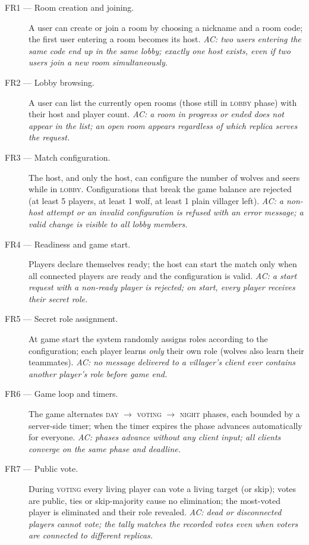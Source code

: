 \documentclass{scrartcl}
\begin{document}
\begin{description}
  \item[FR1 --- Room creation and joining.] A user can create or join a room
  by choosing a nickname and a room code; the first user entering a room
  becomes its host. \emph{AC: two users entering the same code end up in the
  same lobby; exactly one host exists, even if two users join a new room
  simultaneously.}

  \item[FR2 --- Lobby browsing.] A user can list the currently open rooms
  (those still in \textsc{lobby} phase) with their host and player count.
  \emph{AC: a room in progress or ended does not appear in the list; an open
  room appears regardless of which replica serves the request.}

  \item[FR3 --- Match configuration.] The host, and only the host, can
  configure the number of wolves and seers while in \textsc{lobby}.
  Configurations that break the game balance are rejected (at least 5
  players, at least 1 wolf, at least 1 plain villager left).
  \emph{AC: a non-host attempt or an invalid configuration is refused with
  an error message; a valid change is visible to all lobby members.}

  \item[FR4 --- Readiness and game start.] Players declare themselves ready;
  the host can start the match only when all connected players are ready
  and the configuration is valid. \emph{AC: a start request with a
  non-ready player is rejected; on start, every player receives their
  secret role.}

  \item[FR5 --- Secret role assignment.] At game start the system randomly
  assigns roles according to the configuration; each player learns
  \emph{only} their own role (wolves also learn their teammates).
  \emph{AC: no message delivered to a villager's client ever contains
  another player's role before game end.}

  \item[FR6 --- Game loop and timers.] The game alternates
  \textsc{day} $\to$ \textsc{voting} $\to$ \textsc{night} phases, each
  bounded by a server-side timer; when the timer expires the phase advances
  automatically for everyone. \emph{AC: phases advance without any client
  input; all clients converge on the same phase and deadline.}

  \item[FR7 --- Public vote.] During \textsc{voting} every living player can
  vote a living target (or skip); votes are public, ties or skip-majority
  cause no elimination; the most-voted player is eliminated and their role
  revealed. \emph{AC: dead or disconnected players cannot vote; the tally
  matches the recorded votes even when voters are connected to different
  replicas.}


\end{description}
\end{document}
